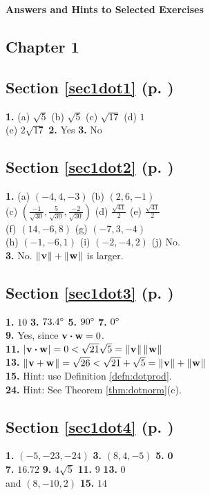 \textsf{\textbf{\Large Answers and Hints to Selected Exercises}}
\begin{multicols}{2}
\section*{Chapter 1}
\subsection*{Section \ref{sec1dot1} (p. \pageref{sec1dot1})}
\textbf{1.} (a) $\sqrt{5}$ \quad (b) $\sqrt{5}$ \quad (c) $\sqrt{17}$ \quad (d) $1$\\(e) $2 \sqrt{17}$ \quad \textbf{2.}
Yes \quad \textbf{3.} No
\subsection*{Section \ref{sec1dot2} (p. \pageref{sec1dot2})}
\textbf{1.} (a) $(-4,4,-3)$ \quad (b) $(2,6,-1)$\\(c) $\left ( \frac{-1}{\sqrt{30}},\frac{5}{\sqrt{30}},
\frac{-2}{\sqrt{30}}\right )$ \quad (d) $\frac{\sqrt{41}}{2}$ \quad (e) $\frac{\sqrt{41}}{2}$\\(f) $(14,-6,8)$ \quad
(g) $(-7,3,-4)$\\(h) $(-1,-6,1)$ \quad (i) $(-2,-4,2)$ \quad (j) No.\\\textbf{3.} No. $\lVert\mspace{1mu}\textbf{v}\mspace{1mu}\rVert +
\lVert\mspace{1mu}\textbf{w}\mspace{1mu}\rVert$ is larger.
\subsection*{Section \ref{sec1dot3} (p. \pageref{sec1dot3})}
\textbf{1.} $10$ \quad \textbf{3.} $73.4^\circ$ \quad \textbf{5.} $90^\circ$ \quad \textbf{7.} $0^\circ$\\
\textbf{9.} Yes, since $\textbf{v} \bm{\cdot} \textbf{w} = 0$.\\\textbf{11.} $\lvert\mspace{1mu}\textbf{v} \bm{\cdot} \textbf{w}\mspace{1mu}\rvert =
0 < \sqrt{21}\sqrt{5} = \lVert\mspace{1mu}\textbf{v}\mspace{1mu}\rVert\,\lVert\mspace{1mu}\textbf{w}\mspace{1mu}\rVert$\\\textbf{13.} $\lVert\mspace{1mu}\textbf{v} + \textbf{w}\mspace{1mu}\rVert = \sqrt{26}
< \sqrt{21} + \sqrt{5} = \lVert\mspace{1mu}\textbf{v}\mspace{1mu}\rVert + \lVert\mspace{1mu}\textbf{w}\mspace{1mu}\rVert$\\\textbf{15.} Hint: use Definition
\ref{defn:dotprod}.\\
\textbf{24.} Hint: See Theorem \ref{thm:dotnorm}(c).
\subsection*{Section \ref{sec1dot4} (p. \pageref{sec1dot4})}
\textbf{1.} $(-5,-23,-24)$ \quad \textbf{3.} $(8,4,-5)$ \quad \textbf{5.} $\textbf{0}$\\\textbf{7.} $16.72$ \quad
\textbf{9.} $4\sqrt{5}$ \quad \textbf{11.} $9$ \quad \textbf{13.} $0$\\and $(8,-10,2)$ \quad \textbf{15.} $14$

\end{multicols}
